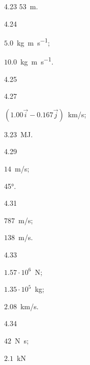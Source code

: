 \begin{Solution}{4.{23}}
		$53$~m.
	
\end{Solution}
\begin{Solution}{4.{24}}
		\begin{enumerate*}[label=(\alph*)]
			\item $5.0$~\si{\kilo\gram\meter\per\second};
			\item  $10.0$~\si{\kilo\gram\meter\per\second}.
		\end{enumerate*}
	
\end{Solution}
\begin{Solution}{4.{25}}
		
	
\end{Solution}
\begin{Solution}{4.{27}}
		\begin{enumerate*}[label=(\alph*)]
			\item $(1.00 \vec i - 0.167\vec j)$~km/s;
			\item $3.23$~MJ.
		\end{enumerate*}
	
\end{Solution}
\begin{Solution}{4.{29}}
		\begin{enumerate*}[label=(\alph*)]
			\item $14$~m/s;
			\item \ang{45}.
		\end{enumerate*}
	
\end{Solution}
\begin{Solution}{4.{31}}
		\begin{enumerate*}[label=(\alph*)]
			\item $787$~m/s;
			\item $138$~m/s.
		\end{enumerate*}
	
\end{Solution}
\begin{Solution}{4.{33}}
		\begin{enumerate*}[label=(\alph*)]
			\item $1.57 \cdot 10^6$~N;
			\item $1.35 \cdot 10^5$~kg;
			\item $2.08$~km/s.
		\end{enumerate*}
	
\end{Solution}
\begin{Solution}{4.{34}}
		\begin{enumerate*}[label=(\alph*)]
			\item $42$~\si{\newton\second};
			\item $2.1$~kN
		\end{enumerate*}
	
\end{Solution}
